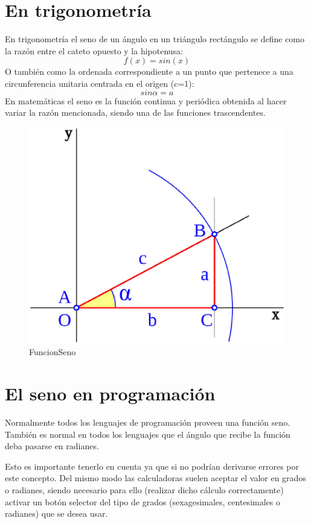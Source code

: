 \section{En trigonometría}

\label{1:sec:1}
En trigonometría el seno de un ángulo en un triángulo rectángulo se define como la razón entre
el cateto opuesto y la hipotenusa:\[f(x)=sin(x)\]
O también como la ordenada correspondiente a un punto que pertenece a una circunferencia unitaria
centrada en el origen (c=1):\[sin \alpha =a\]
En matemáticas el seno es la función continua y periódica obtenida al hacer variar la razón mencionada,
siendo una de las funciones trascendentes.
\begin{figure}[h]
\begin{center}
\includegraphics[scale=0.2]{images/seno.eps}
\end{center}
\caption{FuncionSeno}
\label{graph:3}
\end{figure}

\section{El seno en programación}
\label{1:sec:2}

  Normalmente todos los lenguajes de programación proveen una función
seno. También es normal en todos los lenguajes que el ángulo que recibe
la función deba pasarse en radianes.

  Esto es importante tenerlo en cuenta ya que si no podrían derivarse errores
por este concepto. Del mismo modo las calculadoras suelen aceptar el valor 
en grados o radianes, siendo necesario para ello (realizar dicho cálculo 
correctamente) activar un botón selector del tipo de grados (sexagesimales, 
centesimales o radianes) que se desea usar.

